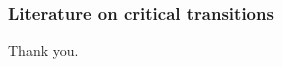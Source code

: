 \documentclass[./main.tex]{subfiles}
\begin{document}
\begin{frame}[label=slide07]
        \frametitle{Literature on critical transitions}


        \nocite{*}
        
        

        \vspace{1cm}

        Thank you.

        \bigskip

        \hyperlink{slide02}{}
        \hyperlink{slide03}{}

\end{frame}
\end{document}
